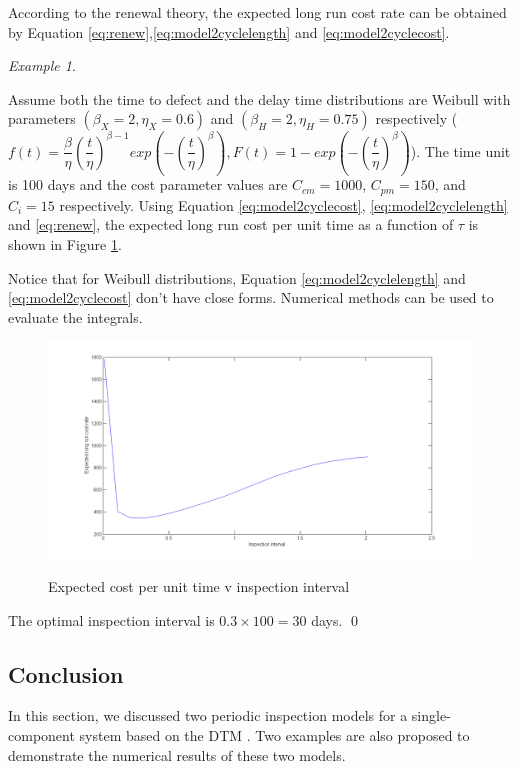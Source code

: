 \documentclass[10pt,a4paper]{article}
\theoremstyle{remark}
\newtheorem{example}{Example}
\begin{document}
According to the renewal theory, the expected long run cost rate can be obtained by Equation \ref{eq:renew},\ref{eq:model2cyclelength} and \ref{eq:model2cyclecost}.

\begin{example} \label{ex:DTM2} \renewcommand{\qedsymbol}{$\lozenge$} \mbox{} 

Assume both the time to defect and the delay time distributions are Weibull with parameters $(\beta_{X}=2,\eta_{X}=0.6)$ and $(\beta_{H}=2,\eta_{H}=0.75)$  respectively ($f(t)=\dfrac{\beta}{\eta}(\dfrac{t}{\eta})^{\beta-1}exp(-(\dfrac{t}{\eta})^{\beta}), F(t)=1-exp(-(\dfrac{t}{\eta})^{\beta})$). The time unit is 100 days and the cost parameter values are $C_{cm}=1000$, $C_{pm}=150$, and $C_{i}=15$ respectively. Using Equation \ref{eq:model2cyclecost}, \ref{eq:model2cyclelength} and \ref{eq:renew}, the expected long run cost per unit time as a function of $\tau$ is shown in Figure \ref{pic:example2}.

Notice that for Weibull distributions, Equation \ref{eq:model2cyclelength} and \ref{eq:model2cyclecost} don't have close forms. Numerical methods can be used to evaluate the integrals.

\begin{figure}[h!!!]  %
  \centering
  \includegraphics[width=6in]{example2.png}\\
  \footnotesize
  \caption{ \footnotesize{Expected cost per unit time v inspection interval} }\label{pic:example2}
\end{figure}

The optimal inspection interval is $0.3 \times 100=30$ days. 
\qed
\end{example}

\subsection{Conclusion}
In this section, we discussed two periodic inspection models for a single-component system based on the DTM \cite{Wang08}. Two examples are also proposed to demonstrate the numerical results of these two models.  
\end{document}
